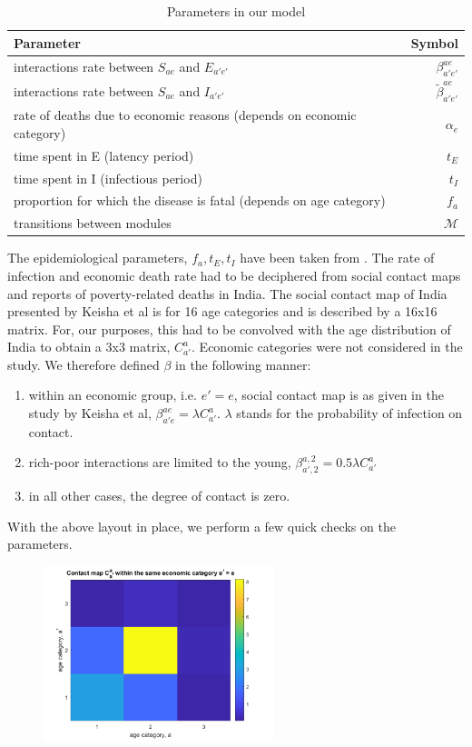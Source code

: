 \documentclass{article}
\begin{document}
\begin{table}[H]
	\centering
	\begin{tabular}{l r} %
		\toprule
		\textbf{Parameter} & \textbf{Symbol} \\ %
		\midrule
		interactions rate between $S_{ae}$ and $E_{a'e'}$ & $\beta^{ae}_{a'e'}$ \\ 
		interactions rate between $S_{ae}$ and $I_{a'e'}$ & $\tilde{\beta}^{ae}_{a'e'}$ \\ 
		rate of deaths due to economic reasons (depends on economic category)  & $\alpha_e$ \\
		time spent in E (latency period) & $t_E$ \\ 
		time spent in I (infectious period) & $t_I$ \\
		proportion for which the disease is fatal (depends on age category) & $f_a$ \\
		transitions between modules & $\mathcal{M}$ \\
		\bottomrule
	\end{tabular}
	\caption{Parameters in our model}
	\label{table:our_model_parameters}
\end{table}
The epidemiological parameters, $f_a, t_E, t_I$ have been taken from \cite{NeherFeb2020}. The rate of infection and economic death rate had to be deciphered from social contact maps \cite{Keisha2017} and reports of poverty-related deaths in India.
The social contact map of India presented by Keisha et al is for 16 age categories and is described by a 16x16 matrix. For, our purposes, this had to be convolved with the age distribution of India to obtain a 3x3 matrix, $ C_{a'}^a$. Economic categories were not considered in the study. We therefore defined $\beta$ in the following manner:
\begin{enumerate}
	\item within an economic group, i.e. $e' = e$, social contact map is as given in the study by Keisha et al, $\beta^{ae}_{a'e} = \lambda C_{a'}^a$. $\lambda$ stands for the probability of infection on contact.
	\item rich-poor interactions are limited to the young, $\beta^{a,2}_{a',2} = 0.5 \lambda C_{a'}^a$
	\item in all other cases, the degree of contact is zero.
\end{enumerate}

With the above layout in place, we perform a few quick checks on the parameters. 
\begin{figure}[H]
	\centering
	\includegraphics[width=0.6\textwidth]{ContactMap}
\end{figure}
\end{document}
